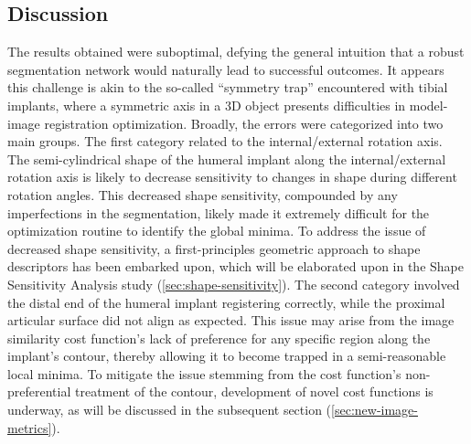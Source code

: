\subsection{Discussion}
The results obtained were suboptimal, defying the general intuition that a robust segmentation network would naturally lead to successful outcomes.
It appears this challenge is akin to the so-called ``symmetry trap'' encountered with tibial implants, where a symmetric axis in a 3D object presents difficulties in model-image registration optimization.
Broadly, the errors were categorized into two main groups.
The first category related to the internal/external rotation axis.
The semi-cylindrical shape of the humeral implant along the internal/external rotation axis is likely to decrease sensitivity to changes in shape during different rotation angles.
This decreased shape sensitivity, compounded by any imperfections in the segmentation, likely made it extremely difficult for the optimization routine to identify the global minima.
To address the issue of decreased shape sensitivity, a first-principles geometric approach to shape descriptors has been embarked upon, which will be elaborated upon in the Shape Sensitivity Analysis study (\cref{sec:shape-sensitivity}).
The second category involved the distal end of the humeral implant registering correctly, while the proximal articular surface did not align as expected. This issue may arise from the image similarity cost function's lack of preference for any specific region along the implant's contour, thereby allowing it to become trapped in a semi-reasonable local minima.
To mitigate the issue stemming from the cost function's non-preferential treatment of the contour, development of novel cost functions is underway, as will be discussed in the subsequent section (\cref{sec:new-image-metrics}).

